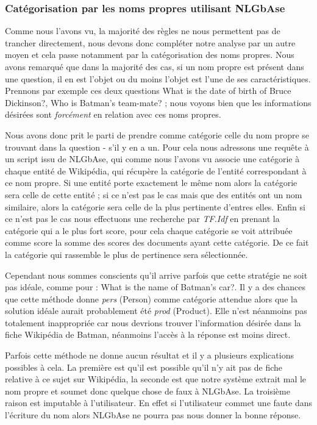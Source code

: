 \documentclass[10pt,a4paper]{article}
\begin{document}
\subsubsection{Catégorisation par les noms propres utilisant NLGbAse}
\par Comme nous l'avons vu, la majorité des règles ne nous permettent pas de trancher directement, nous devons donc compléter notre analyse par un autre moyen et cela passe notamment par la catégorisation des noms propres. Nous avons remarqué que dans la majorité des cas, si un nom propre est présent dans une question, il en est l'objet ou du moins l'objet est l'une de ses caractéristiques. Prennons par exemple ces deux questions \og{}What is the date of birth of Bruce Dickinson?\fg{}, \og{}Who is Batman's team-mate?\fg{} ; nous voyons bien que les informations désirées sont \emph{forcément} en relation avec ces noms propres.
\par Nous avons donc prit le parti de prendre comme catégorie celle du nom propre se trouvant dans la question - s'il y en a un. Pour cela nous adressons une requête à un script issu de NLGbAse, qui comme nous l'avons vu associe une catégorie à chaque entité de Wikipédia, qui récupère la catégorie de l'entité correspondant à ce nom propre. Si une entité porte exactement le même nom alors la catégorie sera celle de cette entité ; si ce n'est pas le cas mais que des entités ont un nom similaire, alors la catégorie sera celle de la plus pertinente d'entres elles. Enfin si ce n'est pas le cas nous effectuons une recherche par \emph{TF.Idf}
en prenant la catégorie qui a le plus fort score, pour cela chaque catégorie se voit attribuée comme score la somme des scores des documents ayant cette catégorie. De ce fait la catégorie qui rassemble le plus de pertinence sera sélectionnée.
\par Cependant nous sommes conscients qu'il arrive parfois que cette stratégie ne soit pas idéale, comme pour : \og{}What is the name of Batman's car?\fg{}. Il y a des chances que cette méthode donne \emph{pers} (Person) comme catégorie attendue alors que la solution idéale aurait probablement été \emph{prod} (Product). Elle n'est néanmoins pas totalement inappropriée car nous devrions trouver l'information désirée dans la fiche Wikipédia de Batman, néanmoins l'accès à la réponse est moins direct.
\par Parfois cette méthode ne donne aucun résultat et il y a plusieurs explications possibles à cela. La première est qu'il est possible qu'il n'y ait pas de fiche relative à ce sujet sur Wikipédia, la seconde est que notre système extrait mal le nom propre et soumet donc quelque chose de faux à NLGbAse. La troisième raison est imputable à l'utilisateur. En effet si l'utilisateur commet une faute dans l'écriture du nom alors NLGbAse ne pourra pas nous donner la bonne réponse. 
\end{document}
